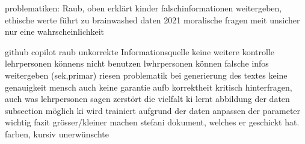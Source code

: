 \documentclass{article}
\begin{document}
problematiken: Raub, oben erklärt kinder falschinformationen weitergeben, ethische werte führt zu brainwashed
daten 2021
moralische fragen meit unsicher
nur eine wahrscheinlichkeit




github copilot
raub
unkorrekte Informationsquelle
keine weitere kontrolle
lehrpersonen könnens nicht benutzen
lwhrpersonen können falsche infos weitergeben (sek,primar)
riesen problematik
bei generierung des textes keine genauigkeit
mensch auch keine garantie aufb korrektheit
kritisch hinterfragen, auch was lehrpersonen sagen
zerstört die vielfalt
ki lernt abbildung der daten
subsection möglich
ki wird trainiert aufgrund der daten
anpassen der parameter wichtig
fazit
grösser/kleiner machen
stefani dokument, welches er geschickt hat.
farben, kursiv unerwünschte
\printbibliography
\end{document}
